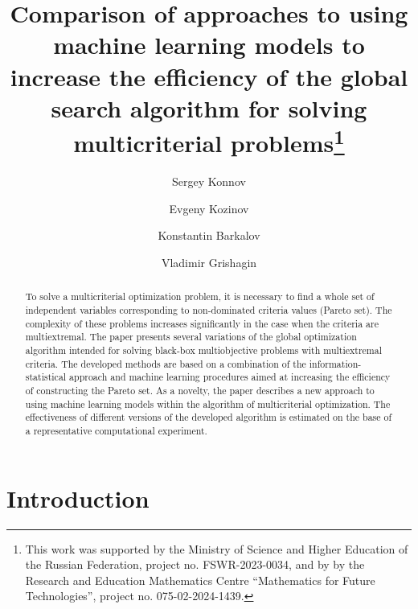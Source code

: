 \documentclass[runningheads]{llncs}
\begin{document}
%
\title{Comparison of approaches to using machine learning models to increase the efficiency of the global search algorithm for solving multicriterial problems\thanks{This work was supported by the Ministry of Science and Higher Education of the Russian Federation, project no. FSWR-2023-0034, and by by the Research and Education Mathematics Centre ``Mathematics for Future Technologies'', project no. 075-02-2024-1439.} }
%
%
\author{Sergey Konnov \and
Evgeny Kozinov \Letter{} \and
Konstantin Barkalov \Letter{} \and
Vladimir Grishagin}
%

%
\maketitle

%
\begin{abstract}
To solve a multicriterial optimization problem, it is necessary to find a whole set of independent variables corresponding to non-dominated criteria values (Pareto set). The complexity of these problems increases significantly in the case when the criteria are multiextremal. The paper presents several variations of the global optimization algorithm intended for solving black-box multiobjective problems with multiextremal criteria. The developed methods are based on a combination of the information-statistical approach and machine learning procedures aimed at increasing the efficiency of constructing the Pareto set. As a novelty, the paper describes a new approach to using machine learning models within the algorithm of multicriterial optimization. The effectiveness of different versions of the developed algorithm is estimated on the base of  a representative computational experiment.

\end{abstract}
%
%
%
\section{Introduction}
\label{sec:1}
\end{document}
